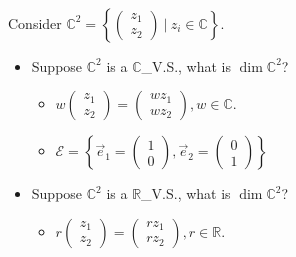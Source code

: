\documentclass[11pt,fleqn]{book} %
\begin{document}
\begin{example}
{~~~}

    Consider $\mathbb{C}^2 = \left\{ \begin{pmatrix} z_1\\z_2 \end{pmatrix} ~|~ z_i \in \mathbb{C} \right\}$. 
    
    \begin{itemize}
        \item Suppose $\mathbb{C}^2$ is a $\mathbb{C}$\_V.S., what is $\dim \mathbb{C}^2$? 
        
        \begin{itemize}
            \item $w\begin{pmatrix} z_1\\z_2 \end{pmatrix} = \begin{pmatrix} wz_1 \\ wz_2\end{pmatrix}, w\in \mathbb{C}$. 

            \item $\mathcal{E} = \left\{ \vec{e}_1 = \begin{pmatrix} 1\\0 \end{pmatrix}, \vec{e}_2=\begin{pmatrix} 0\\1 \end{pmatrix} \right\}$
        \end{itemize}
        
        \item Suppose $\mathbb{C}^2$ is a $\mathbb{R}$\_V.S., what is $\dim \mathbb{C}^2$? 
        
        \begin{itemize}
            \item $r \begin{pmatrix} z_1\\z_2 \end{pmatrix} = \begin{pmatrix} rz_1 \\ rz_2\end{pmatrix}, r \in \mathbb{R}$. 


\end{itemize}
\end{itemize}
\end{example}
\end{document}
